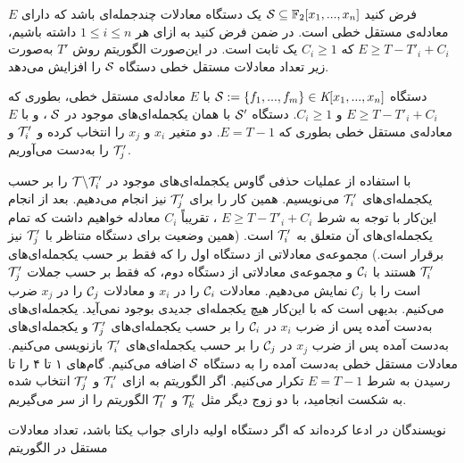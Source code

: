 فرض  کنید 
${\mathcal S}\subseteq \mathbb{F}_{2}[x_{1},...,x_{n}]$
یک دستگاه معادلات چندجمله‌ای باشد که دارای 
$E$
معادله‌ی مستقل خطی است. در ضمن فرض کنید به ازای هر 
$1\leq i\leq n$
داشته باشیم، 
$E\geq T - T'_{i} + C_{i}$
که 
$C_{i}\geq 1$
یک ثابت است. در این‌صورت الگوریتم روش 
$T'$
به‌صورت زیر تعداد معادلات مستقل خطی دستگاه 
${\mathcal S}$
را افزایش می‌دهد. 
\begin{algorithm}[H]
	\renewcommand{\algorithmicrequire}{\textbf{ورودی}}
	\renewcommand{\algorithmicensure}{\textbf{خروجی}}
	\caption{}
	\label{T' method}
	\begin{algorithmic}[1]				
		\REQUIRE دستگاه 
		${\mathcal S}:= \{f_{1},...,f_{m}\}\in \textit{K}[x_{1},...,x_{n}]$
		با 
	$E$
	معادله‌ی مستقل خطی، بطوری که 
	$E\geq T - T'_{i} + C_{i}$
	و
	$C_{i}\geq 1$.
		\ENSURE 
		دستگاه 
		${\mathcal S}'$ 
		با همان یکجمله‌ای‌های موجود در 
		${\mathcal S}$
		، و با 
		$E$
		معادله‌ی مستقل خطی بطوری که 
		{\small $E = T - 1$}.
		\STATE دو متغیر 
		$x_{i}$
		و
		$x_{j}$
		را انتخاب کرده و 
		${\mathcal T}'_{i}$
		و
		${\mathcal T}'_{j}$
		را به‌دست  می‌آوریم. 
		
		\STATE با استفاده از عملیات حذفی گاوس  یکجمله‌ای‌های موجود در 
		${\mathcal T}\backslash {\mathcal T}'_{i}$
		را بر حسب یکجمله‌ای‌های 
		${\mathcal T}'_{i}$
		می‌نویسیم. همین کار را برای 
		${\mathcal T}'_{j}$
		نیز انجام می‌دهیم. بعد از انجام این‌کار با توجه به شرط 
		$E\geq T - T'_{i} + C_{i}$
		، تقریباً 
		$C_{i}$
		معادله خواهیم داشت که تمام یکجمله‌ای‌های آن متعلق به 
		${\mathcal T}'_{i}$
		است. (همین وضعیت برای دستگاه متناظر با 
		${\mathcal T}'_{j}$
		نیز برقرار است.)  مجموعه‌ی معادلاتی از دستگاه اول را که فقط بر حسب یکجمله‌ای‌های 
		 ${\mathcal T}'_{i}$
		 هستند با 
		 ${\mathcal C}_{i}$
		و مجموعه‌ی معادلاتی از دستگاه دوم، که فقط بر حسب جملات 
		${\mathcal T}'_{j}$
است را با 
${\mathcal C}_{j}$
نمایش می‌دهیم. 
\STATE معادلات 
${\mathcal C}_{i}$
را در 
$x_{i}$
و معادلات 
${\mathcal C}_{j}$
را در 
$x_{j}$
ضرب می‌کنیم. بدیهی است که با این‌کار هیچ یکجمله‌ای جدیدی بوجود نمی‌آید. 
\STATE  یکجمله‌ای‌های به‌دست  آمده پس از ضرب 
$x_{i}$
در 
${\mathcal C}_{i}$
را بر حسب یکجمله‌ای‌های 
${\mathcal T}'_{j}$
و یکجمله‌ای‌های به‌دست  آمده پس از ضرب 
$x_{j}$
در 
${\mathcal C}_{j}$
را بر حسب یکجمله‌ای‌های 
${\mathcal T}'_{i}$
بازنویسی می‌کنیم. معادلات مستقل خطی به‌دست  آمده را به دستگاه 
${\mathcal S}$
اضافه می‌کنیم. 
\STATE 
گام‌های ۱ تا ۴ را تا رسیدن به شرط 
$E = T - 1$
تکرار می‌کنیم. اگر الگوریتم به ازای 
${\mathcal T}'_{i}$
و
${\mathcal T}'_{j}$
انتخاب شده به شکست انجامید، با دو زوج دیگر مثل 
${\mathcal T}'_{k}$
و
${\mathcal T}'_{l}$
الگوریتم را از سر می‌گیریم.
	\end{algorithmic}
\end{algorithm}
نویسندگان در 
\cite{courtois2002cryptanalysis}
ادعا کرده‌اند که اگر دستگاه اولیه دارای جواب یکتا باشد، تعداد معادلات مستقل در الگوریتم 
